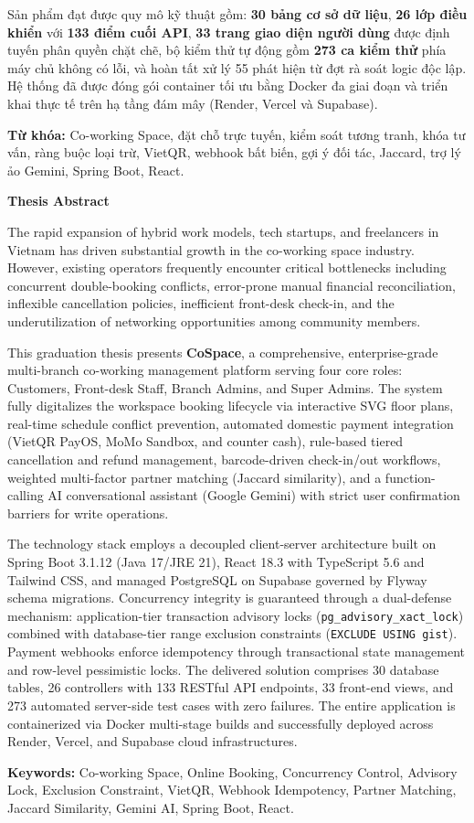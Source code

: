 Sản phẩm đạt được quy mô kỹ thuật gồm: \textbf{30 bảng cơ sở dữ liệu}, \textbf{26 lớp điều khiển} với \textbf{133 điểm cuối API}, \textbf{33 trang giao diện người dùng} được định tuyến phân quyền chặt chẽ, bộ kiểm thử tự động gồm \textbf{273 ca kiểm thử} phía máy chủ không có lỗi, và hoàn tất xử lý 55 phát hiện từ đợt rà soát logic độc lập. Hệ thống đã được đóng gói container tối ưu bằng Docker đa giai đoạn và triển khai thực tế trên hạ tầng đám mây (Render, Vercel và Supabase).

\vspace{0.4cm}
\noindent\textbf{Từ khóa:} Co-working Space, đặt chỗ trực tuyến, kiểm soát tương tranh, khóa tư vấn, ràng buộc loại trừ, VietQR, webhook bất biến, gợi ý đối tác, Jaccard, trợ lý ảo Gemini, Spring Boot, React.

\vspace{1cm}
\begin{center}
\textbf{\LARGE Thesis Abstract}
\end{center}
\vspace{0.3cm}

The rapid expansion of hybrid work models, tech startups, and freelancers in Vietnam has driven substantial growth in the co-working space industry. However, existing operators frequently encounter critical bottlenecks including concurrent double-booking conflicts, error-prone manual financial reconciliation, inflexible cancellation policies, inefficient front-desk check-in, and the underutilization of networking opportunities among community members. 

This graduation thesis presents \textbf{CoSpace}, a comprehensive, enterprise-grade multi-branch co-working management platform serving four core roles: Customers, Front-desk Staff, Branch Admins, and Super Admins. The system fully digitalizes the workspace booking lifecycle via interactive SVG floor plans, real-time schedule conflict prevention, automated domestic payment integration (VietQR PayOS, MoMo Sandbox, and counter cash), rule-based tiered cancellation and refund management, barcode-driven check-in/out workflows, weighted multi-factor partner matching (Jaccard similarity), and a function-calling AI conversational assistant (Google Gemini) with strict user confirmation barriers for write operations.

The technology stack employs a decoupled client-server architecture built on Spring Boot 3.1.12 (Java 17/JRE 21), React 18.3 with TypeScript 5.6 and Tailwind CSS, and managed PostgreSQL on Supabase governed by Flyway schema migrations. Concurrency integrity is guaranteed through a dual-defense mechanism: application-tier transaction advisory locks (\texttt{pg\_advisory\_xact\_lock}) combined with database-tier range exclusion constraints (\texttt{EXCLUDE USING gist}). Payment webhooks enforce idempotency through transactional state management and row-level pessimistic locks. The delivered solution comprises 30 database tables, 26 controllers with 133 RESTful API endpoints, 33 front-end views, and 273 automated server-side test cases with zero failures. The entire application is containerized via Docker multi-stage builds and successfully deployed across Render, Vercel, and Supabase cloud infrastructures.

\vspace{0.4cm}
\noindent\textbf{Keywords:} Co-working Space, Online Booking, Concurrency Control, Advisory Lock, Exclusion Constraint, VietQR, Webhook Idempotency, Partner Matching, Jaccard Similarity, Gemini AI, Spring Boot, React.
